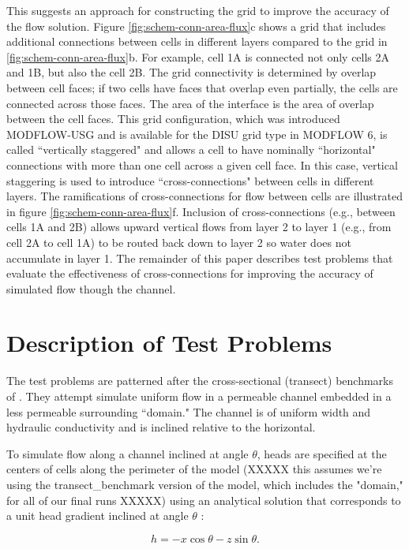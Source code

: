 \documentclass{article}
\begin{document}
This suggests an approach for constructing the grid to improve the accuracy of the flow solution. Figure \ref{fig:schem-conn-area-flux}c shows a grid that includes additional connections between cells in different layers compared to the grid in \ref{fig:schem-conn-area-flux}b. For example, cell 1A is connected not only cells 2A and 1B, but also the cell 2B. The grid connectivity is determined by overlap between cell faces; if two cells have faces that overlap even partially, the cells are connected across those faces. The area of the interface is the area of overlap between the cell faces. This grid configuration, which was introduced MODFLOW-USG \citep{modflowusg} and is available for the DISU grid type in MODFLOW 6, is called ``vertically staggered" and allows a cell to have nominally ``horizontal" connections with more than one cell across a given cell face. In this case, vertical staggering is used to introduce ``cross-connections" between cells in different layers. The ramifications of cross-connections for flow between cells are illustrated in figure \ref{fig:schem-conn-area-flux}f. Inclusion of cross-connections (e.g., between cells 1A and 2B) allows upward vertical flows from layer 2 to layer 1 (e.g., from cell 2A to cell 1A) to be routed back down to layer 2 so water does not accumulate in layer 1. The remainder of this paper describes test problems that evaluate the effectiveness of cross-connections for improving the accuracy of simulated flow though the channel.

\section{Description of Test Problems}

The test problems are patterned after the cross-sectional (transect) benchmarks of \cite{bardot2022}. They attempt simulate uniform flow in a permeable channel embedded in a less permeable surrounding ``domain." The channel is of uniform width and hydraulic conductivity and is inclined relative to the horizontal.

To simulate flow along a channel inclined at angle $\theta$, heads are specified at the centers of cells along the perimeter of the model (XXXXX this assumes we're using the transect\_benchmark version of the model, which includes the "domain," for all of our final runs XXXXX) using an analytical solution that corresponds to a unit head gradient inclined at angle $\theta$ \citep{bardot2022}:

\begin{equation}
\label{eqn:head_analyt_along}
h = - x \cos \theta - z \sin \theta.
\end{equation}
\end{document}
